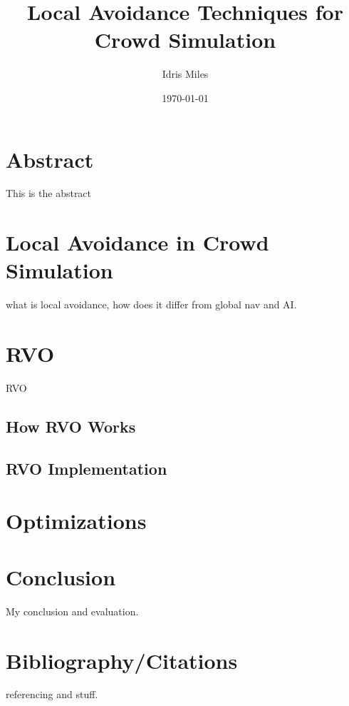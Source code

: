 \documentclass[a4paper,teocolumn]{article}
\author{Idris Miles}
\title{Local Avoidance Techniques for Crowd Simulation}
\date{\today}
\begin{document}
\maketitle
\newpage

\tableofcontents
\newpage

\section{Abstract}
This is the abstract \\
\newpage

\section{Local Avoidance in Crowd Simulation}
what is local avoidance, how does it differ from global nav and AI.
\\
\section{RVO}
RVO
\\
\subsection{How RVO Works}

\subsection{RVO Implementation}

\newpage

\section{Optimizations}

\section{Conclusion}
My conclusion and evaluation.\\
\newpage

\section{Bibliography/Citations}
referencing and stuff. \\
\end{document}
